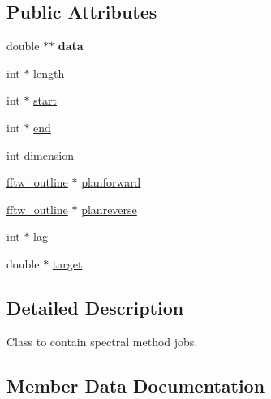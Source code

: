 \subsection*{Public Attributes}
\begin{DoxyCompactItemize}
\item 
\mbox{\label{classthreaded__ac__jobs__fft_ac4b3840c07d3dbd3f6d84371ec31e514}} 
double $\ast$$\ast$ {\bfseries data}
\item 
int $\ast$ \hyperlink{classthreaded__ac__jobs__fft_ad2c291ac1d43caab4e0c311653526d78}{length}
\item 
int $\ast$ \hyperlink{classthreaded__ac__jobs__fft_ab53d18101cba2f6e8894076aec04e033}{start}
\item 
int $\ast$ \hyperlink{classthreaded__ac__jobs__fft_a86501045468f92ae2c49b34cffe1aea3}{end}
\item 
int \hyperlink{classthreaded__ac__jobs__fft_a9bf661425ff94cfa740827b2e2affd18}{dimension}
\item 
\hyperlink{structfftw__outline}{fftw\+\_\+outline} $\ast$ \hyperlink{classthreaded__ac__jobs__fft_ac862074b94a8a1403f355110bf428cfc}{planforward}
\item 
\hyperlink{structfftw__outline}{fftw\+\_\+outline} $\ast$ \hyperlink{classthreaded__ac__jobs__fft_a9f821f5df06f0dd6b223444759143c0e}{planreverse}
\item 
int $\ast$ \hyperlink{classthreaded__ac__jobs__fft_a98153770612f6a063018be6a43cb6320}{lag}
\item 
double $\ast$ \hyperlink{classthreaded__ac__jobs__fft_a3a7fa6df5c4af8bce5820c483598fc9e}{target}
\end{DoxyCompactItemize}


\subsection{Detailed Description}
Class to contain spectral method jobs. 

\subsection{Member Data Documentation}
\mbox{\label{classthreaded__ac__jobs__fft_a9bf661425ff94cfa740827b2e2affd18}} 
